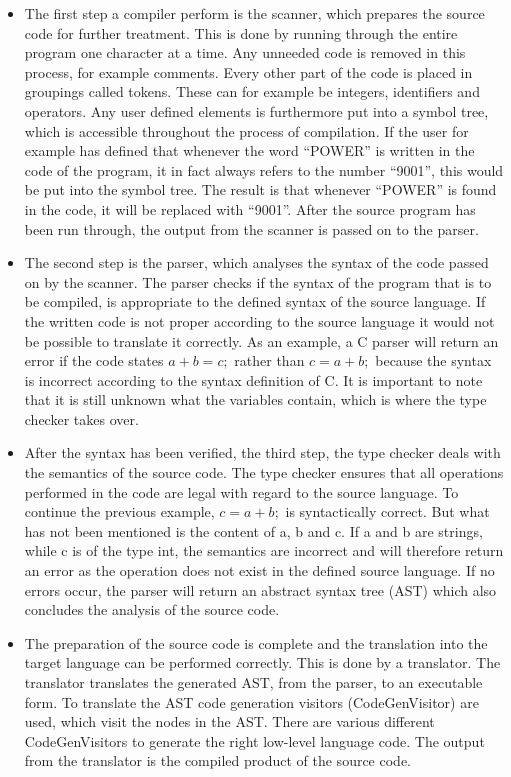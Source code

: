 \begin{itemize}
	\item The first step a compiler perform is the scanner, which prepares the source code for further treatment. This is done by running through the entire program one character at a time. Any unneeded code is removed in this process, for example comments.  Every other part of the code is placed in groupings called tokens. These can for example be integers, identifiers and operators. Any user defined elements is furthermore put into a symbol tree, which is accessible throughout the process of compilation. If the user for example has defined that whenever the word ``POWER'' is written in the code of the program, it in fact always refers to the number ``9001'', this would be put into the symbol tree. The result is that whenever ``POWER'' is found in the code, it will be replaced with ``9001''. After the source program has been run through, the output from the scanner is passed on to the parser.
	
	\item The second step is the parser, which analyses the syntax of the code passed on by the scanner. The parser checks if the syntax of the program that is to be compiled, is appropriate to the defined syntax of the source language. If the written code is not proper according to the source language it would not be possible to translate it correctly. As an example, a C parser will return an error if the code states $a + b = c;$ rather than $c = a + b;$ because the syntax is incorrect according to the syntax definition of C. It is important to note that it is still unknown what the variables contain, which is where the type checker takes over.

	\item After the syntax has been verified, the third step, the type checker deals with the semantics of the source code. The type checker ensures that all operations performed in the code are legal with regard to the source language. To continue the previous example, $c = a + b;$ is syntactically correct. But what has not been mentioned is the content of a, b and c. If a and b are strings, while c is of the type int, the semantics are incorrect and will therefore return an error as the operation does not exist in the defined source language. If no errors occur, the parser will return an abstract syntax tree (AST) which also concludes the analysis of the source code. 

	\item The preparation of the source code is complete and the translation into the target language can be performed correctly. This is done by a translator. The translator translates the generated AST, from the parser, to an executable form. To translate the AST code generation visitors (CodeGenVisitor) are used, which visit the nodes in the AST. There are various different CodeGenVisitors to generate the right low-level language code. The output from the translator is the compiled product of the source code.
\end{itemize}


